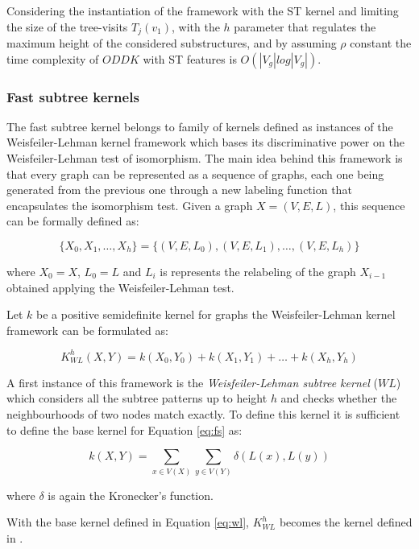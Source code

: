 Considering the instantiation of the framework with the ST kernel and limiting
the size of the tree-visits $T_j(v_1)$, with the $h$ parameter that regulates the
maximum height of the considered substructures, and by assuming $\rho$ constant
the time complexity of $ODDK$ with ST features is $O(|V_g|log|V_g|)$.

\subsubsection{Fast subtree kernels}
\label{subsubsec:fs}
The fast subtree kernel \cite{NIPS2009_3813} belongs to family of kernels defined
as instances of the Weisfeiler-Lehman kernel framework which bases its discriminative
power on the Weisfeiler-Lehman test of isomorphism.
The main idea behind this framework is that every graph can be represented as
a sequence of graphs, each one being generated from the previous one through
a new labeling function that encapsulates the isomorphism test.
Given a graph $X = (V,E,L)$, this sequence can be formally defined as:

\[\{X_0,X_1,\dots,X_h\} = \{(V,E,L_0),(V,E,L_1),\dots,(V,E,L_h)\}\]

where $X_0 = X$, $L_0 = L$ and $L_i$ is represents the relabeling of the graph
$X_{i-1}$ obtained applying the Weisfeiler-Lehman test.

Let $k$ be a positive semidefinite kernel for graphs the Weisfeiler-Lehman kernel
framework can be formulated as:

\begin{equation}
    K_{WL}^h(X,Y) = k(X_0,Y_0) + k(X_1,Y_1) + \dots + k(X_h,Y_h)
    \label{eq:fs}
\end{equation}

A first instance of this framework is the \emph{Weisfeiler-Lehman subtree kernel}
($WL$) which considers all the subtree patterns up to height $h$ and checks whether the
neighbourhoods of two nodes match exactly.
To define this kernel it is sufficient to define the base kernel for Equation
\ref{eq:fs} as:

\begin{equation}
    k(X,Y) = \sum_{x \in V(X)}\sum_{y \in V(Y)} \delta(L(x),L(y))
    \label{eq:wl}
\end{equation}

where $\delta$ is again the Kronecker's function.

With the base kernel defined in Equation \ref{eq:wl}, $K_{WL}^h$ becomes the
kernel defined in \cite{NIPS2009_3813}.

